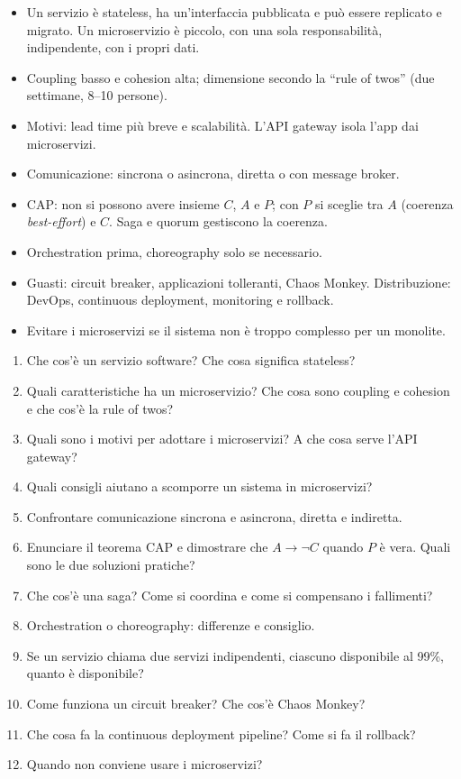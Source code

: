 \begin{puntichiave}
\begin{itemize}
  \item Un servizio è stateless, ha un'interfaccia pubblicata e può essere replicato e migrato. Un microservizio è piccolo,
    con una sola responsabilità, indipendente, con i propri dati.
  \item Coupling basso e cohesion alta; dimensione secondo la ``rule of twos'' (due settimane, 8--10 persone).
  \item Motivi: lead time più breve e scalabilità. L'API gateway isola l'app dai microservizi.
  \item Comunicazione: sincrona o asincrona, diretta o con message broker.
  \item CAP: non si possono avere insieme $C$, $A$ e $P$; con $P$ si sceglie tra $A$ (coerenza \emph{best-effort}) e $C$.
    Saga e quorum gestiscono la coerenza.
  \item Orchestration prima, choreography solo se necessario.
  \item Guasti: circuit breaker, applicazioni tolleranti, Chaos Monkey. Distribuzione: DevOps, continuous deployment,
    monitoring e rollback.
  \item Evitare i microservizi se il sistema non è troppo complesso per un monolite.
\end{itemize}
\end{puntichiave}

\begin{domande}
\begin{enumerate}
  \item Che cos'è un servizio software? Che cosa significa stateless?
  \item Quali caratteristiche ha un microservizio? Che cosa sono coupling e cohesion e che cos'è la rule of twos?
  \item Quali sono i motivi per adottare i microservizi? A che cosa serve l'API gateway?
  \item Quali consigli aiutano a scomporre un sistema in microservizi?
  \item Confrontare comunicazione sincrona e asincrona, diretta e indiretta.
  \item Enunciare il teorema CAP e dimostrare che $A \rightarrow \neg C$ quando $P$ è vera. Quali sono le due soluzioni pratiche?
  \item Che cos'è una saga? Come si coordina e come si compensano i fallimenti?
  \item Orchestration o choreography: differenze e consiglio.
  \item Se un servizio chiama due servizi indipendenti, ciascuno disponibile al 99\%, quanto è disponibile?
  \item Come funziona un circuit breaker? Che cos'è Chaos Monkey?
  \item Che cosa fa la continuous deployment pipeline? Come si fa il rollback?
  \item Quando non conviene usare i microservizi?
\end{enumerate}
\end{domande}
